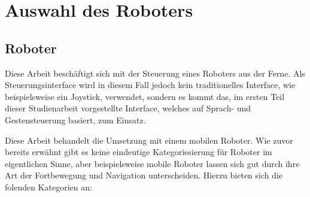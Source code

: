 \chapter{Auswahl des Roboters}
\label{chap:Roboterauswahl}


\section{Roboter}

Diese Arbeit besch\"aftigt sich mit der Steuerung eines Roboters aus der Ferne. Als Steuerungsinterface wird in diesem Fall jedoch kein traditionelles Interface, wie beispielsweise ein Joystick, verwendet, sondern es kommt das, im ersten Teil dieser Studienarbeit vorgestellte Interface, welches auf Sprach- und Gestensteuerung basiert, zum Einsatz.
\par\smallskip
Diese Arbeit behandelt die Umsetzung mit einem mobilen Roboter. Wie zuvor bereits erwähnt gibt es keine eindeutige Kategoriesierung für Roboter im eigentlichen Sinne, aber beispielsweise mobile Roboter lassen sich gut durch ihre Art der Fortbewegung und Navigation unterscheiden. Hierzu bieten sich die folenden Kategorien an\footnotemark[10]:


